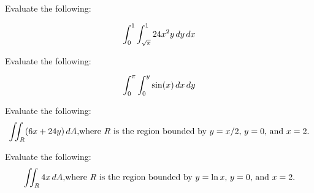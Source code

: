 \documentclass[12pt,letterpaper]{hmcpset}
\begin{document}

\begin{problem}[1.a]

    Evaluate the following:

    \[
        \int_{0}^{1} \int_{\sqrt x}^{1} 24 x^2y\,dy\,dx\\
    \]

\end{problem}

\begin{solution}

\end{solution}

\begin{problem}[1.b]

    Evaluate the following:

    \[
        \int_{0}^{\pi} \int_{0}^{y} \sin(x)\,dx\,dy\\
    \]

\end{problem}

\begin{solution}

\end{solution}

\begin{problem}[2.a]

    Evaluate the following:
    \[
        \int\!\!\!\int_{R} (6x + 24y)\,dA \text {,where $R$ is the region bounded by }y= x/2\text{, } y = 0 \text{, and } x=2.\\
    \]

\end{problem}

\begin{solution}

\end{solution}

\begin{problem}[2.b]

    Evaluate the following:
    \[
        \int\!\!\!\int_{R} 4x\,dA \text {,where $R$ is the region bounded by }y= \ln x\text{, } y = 0 \text{, and } x=2.\\
    \]

\end{problem}

\begin{solution}
\end{solution}
\end{document}
